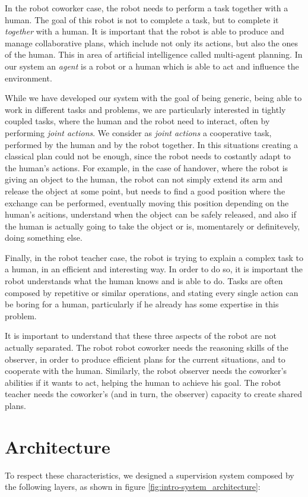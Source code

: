 In the robot coworker case, the robot needs to perform a task together with a human. The goal of this robot is not to complete a task, but to complete it \textit{together} with a human.  It is important that the robot is able to produce and manage collaborative plans, which include not only its actions, but also the ones of the human. This in area of artificial intelligence called multi-agent planning. In our system an \textit{agent} is a robot or a human which is able to act and influence the environment. 

While we have developed our system with the goal of being generic, being able to work in different tasks and problems, we are particularly interested in tightly coupled tasks, where the human and the robot need to interact, often by performing \textit{joint actions}. We consider as \textit{joint actions} a cooperative task, performed by the human and by the robot together. In this situations creating a classical plan could not be enough, since the robot needs to costantly adapt to the human's actions. For example, in the case of handover, where the robot is giving an object to the human, the robot can not simply extend its arm and release the object at some point, but needs to find a good position where the exchange can be performed, eventually moving this position depending on the human's acitions, understand when the object can be safely released, and also if the human is actually going to take the object or is, momentarely or definitevely, doing something else.

Finally, in the robot teacher case, the robot is trying to explain a complex task to a human, in an efficient and interesting way. In order to do so, it is important the robot understands what the human knows and is able to do. Tasks are often composed by repetitive or similar operations, and stating every single action can be boring for a human, particularly if he already has some expertise in this problem. 

It is important to understand that these three aspects of the robot are not actually separated. The robot robot coworker needs the reasoning skills of the observer, in order to produce efficient plans for the current situations, and to cooperate with the human. Similarly, the robot observer needs the coworker's abilities if it wants to act, helping the human to achieve his goal. The robot teacher needs the coworker's (and in turn, the observer) capacity to create shared plans.


\section{Architecture}
To respect these characteristics, we designed a supervision system composed by the following layers, as shown in figure \ref{fig:intro-system_architecture}:

